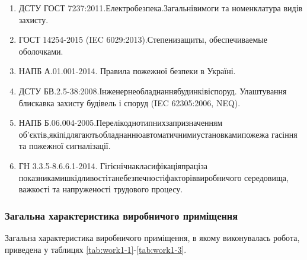 \begin{enumerate}
	\item ДСТУ ГОСТ 7237:2011.\hfill Електробезпека.\hfill Загальні\hfill вимоги\newline \hspace*{-18mm} та номенклатура видів захисту.
	\item ГОСТ 14254-2015 (IEC 6029:2013).\hfill Степени\hfill защиты,\newline \hspace*{-18mm} обеспечиваемые оболочками.
	\item НАПБ А.01.001-2014. Правила пожежної безпеки в Україні.
	\item ДСТУ БВ.2.5-38:2008.\hfill Інженерне\hfill обладнання\hfill будинків\hfill і\hfill споруд.\newline \hspace*{-18mm} Улаштування блискавка захисту будівель і споруд (IEC 62305:2006, NEQ).
	\item НАПБ Б.06.004-2005.\hfill Перелік\hfill однотипних\hfill за\hfill призначенням\newline \hspace*{-18mm} об’єктів,\hfill які\hfill підлягають\hfill обладнанню\hfill автоматичними\hfill установками\hfill пожежа\newline \hspace*{-18mm} гасіння та пожежної сигналізації.
	\item ГН 3.3.5-8.6.6.1-2014. \hfill Гігієнічна\hfill класифікація\hfill праці\hfill за\newline \hspace*{-18mm} показниками\hfill шкідливості\hfill та\hfill небезпечності\hfill факторів\hfill виробничого\newline \hspace*{-18mm} середовища, важкості та напруженості трудового процесу.
\end{enumerate}

\subsubsection{Загальна характеристика виробничого приміщення}

Загальна характеристика виробничого приміщення, в якому виконувалась робота, приведена у таблицях \ref{tab:work1-1}-\ref{tab:work1-3}.

